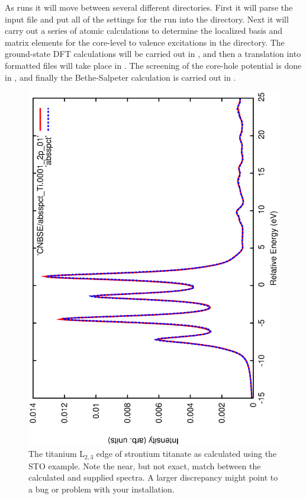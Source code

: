 \documentclass[11pt]{report}
\begin{document}
As  runs it will move between several different directories. First it will parse the input file and put all of the settings for the run into the  directory. Next it will carry out a series of atomic calculations to determine the localized basis and matrix elements for the core-level to valence excitations in the  directory. The ground-state DFT calculations will be carried out in , and then a translation into  formatted files will take place in . The screening of the core-hole potential is done in , and finally the Bethe-Salpeter calculation is carried out in .

\begin{figure}
\center
\includegraphics[angle=270,width=4.5in]{sto_compare.eps}
\caption{ The titanium L$_{2,3}$ edge of strontium titanate as calculated using the STO example. Note the near, but not exact, match between the calculated and supplied spectra. A larger discrepancy might point to a bug or problem with your installation. }
\label{STO_plot}
\end{figure}
\end{document}
